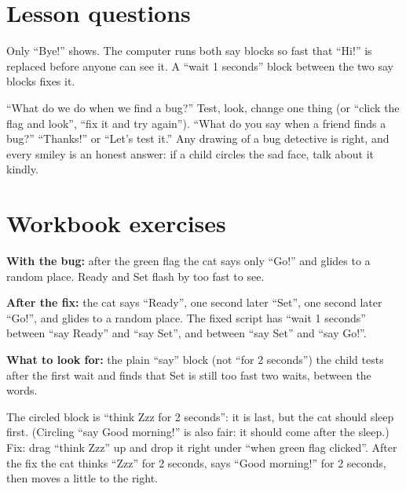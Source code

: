 
\section{Lesson questions}
\begin{answer}
Only \enquote{Bye!} shows. The computer runs both say blocks so fast that \enquote{Hi!} is replaced before anyone can see it. A \enquote{wait 1 seconds} block between the two say blocks fixes it.
\end{answer}

\begin{answer}[Reflection]
\enquote{What do we do when we find a bug?} Test, look, change one thing (or \enquote{click the flag and look}, \enquote{fix it and try again}). \enquote{What do you say when a friend finds a bug?} \enquote{Thanks!} or \enquote{Let's test it.} Any drawing of a bug detective is right, and every smiley is an honest answer: if a child circles the sad face, talk about it kindly.
\end{answer}

\section{Workbook exercises}
\begin{answer}
\textbf{With the bug:} after the green flag the cat says only \enquote{Go!} and glides to a random place. Ready and Set flash by too fast to see.

\textbf{After the fix:} the cat says \enquote{Ready}, one second later \enquote{Set}, one second later \enquote{Go!}, and glides to a random place. The fixed script has \enquote{wait 1 seconds} between \enquote{say Ready} and \enquote{say Set}, and between \enquote{say Set} and \enquote{say Go!}.

\textbf{What to look for:} \tickbox{} the plain \enquote{say} block (not \enquote{for 2 seconds}) \quad \tickbox{} the child tests after the first wait and finds that Set is still too fast \quad \tickbox{} two waits, between the words.
\end{answer}

\begin{answer}
The circled block is \enquote{think Zzz for 2 seconds}: it is last, but the cat should sleep first. (Circling \enquote{say Good morning!} is also fair: it should come after the sleep.) Fix: drag \enquote{think Zzz} up and drop it right under \enquote{when green flag clicked}. After the fix the cat thinks \enquote{Zzz} for 2 seconds, says \enquote{Good morning!} for 2 seconds, then moves a little to the right.
\end{answer}


